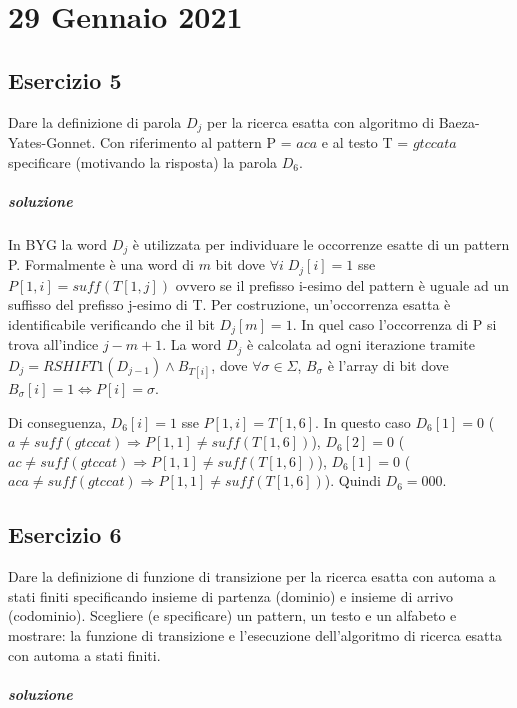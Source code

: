 \chapter{29 Gennaio 2021}

\section{Esercizio 5}

Dare la definizione di parola $D_j$ per la ricerca esatta con algoritmo di Baeza-Yates-Gonnet.
Con riferimento al pattern P = $aca$ e al testo T = $gtccata$ specificare (motivando la risposta) la parola $D_6$.

\paragraph{soluzione}

In BYG la word $D_j$ \`e utilizzata per individuare le occorrenze esatte di un pattern P. Formalmente \`e una word di $m$ bit dove $\forall i \; D_j[i] = 1$ sse $P[1,i] = suff(T[1,j])$ ovvero se il prefisso i-esimo del pattern \`e uguale ad un suffisso del prefisso j-esimo di T. Per costruzione, un'occorrenza esatta \`e identificabile verificando che il bit $D_j[m] = 1$. In quel caso l'occorrenza di P si trova all'indice $j - m + 1$.
La word $D_j$ \`e calcolata ad ogni iterazione tramite $D_j = RSHIFT1(D_{j-1}) \land B_{T[i]}$, dove $\forall \sigma \in \Sigma$, $B_{\sigma}$ \`e l'array di bit dove $B_{\sigma}[i] = 1 \Leftrightarrow P[i] = \sigma$.

Di conseguenza, $D_6[i] = 1$ sse $P[1,i] = T[1,6]$. In questo caso $D_6[1] = 0$ ($a \neq suff(gtccat) \Rightarrow P[1,1] \neq suff(T[1,6])$), $D_6[2] = 0$ ($ac \neq suff(gtccat) \Rightarrow P[1,1] \neq suff(T[1,6])$),  $D_6[1] = 0$ ($aca \neq suff(gtccat) \Rightarrow P[1,1] \neq suff(T[1,6])$). Quindi $D_6 = 000$.

\section{Esercizio 6}

Dare la definizione di funzione di transizione per la ricerca esatta con automa a stati finiti specificando insieme di partenza (dominio) e insieme di arrivo (codominio).
Scegliere (e specificare) un pattern, un testo e un alfabeto e mostrare: la funzione di transizione e l'esecuzione dell'algoritmo di ricerca esatta con automa a stati finiti.

\paragraph{soluzione}

